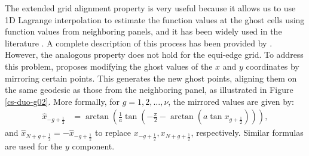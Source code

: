 \documentclass[preprint,12pt]{elsarticle}
\begin{document}
\begin{linenumbers}
%	

The extended grid alignment property is very useful because it allows us to use 1D Lagrange interpolation to estimate the function values at the ghost cells using function values from neighboring panels, and it has been widely used in the literature \cite{ross:2006, croisille:2013,katta:2015,katta:2015b, chen:2021}. 
A complete description of this process has been provided by \cite{zerroukat:2022}. %
However, the analogous property does not hold for the equi-edge grid.
To address this problem, \cite{chen:2021} proposes modifying the ghost values of the $x$ and $y$ coordinates by mirroring certain points. 
This generates the new ghost points, aligning them on the same geodesic as those from the neighboring panel, as illustrated in Figure \ref{cs-duo-g02}.
More formally, for $g=1,2,\ldots,\nu$, the mirrored values are given by:
\begin{align}
	\hat{x}_{-g+\frac{1}{2}}  &= \arctan\left(\frac{1}{a}\tan\left(-\frac{\pi}{2}-\arctan{(a \tan{x_{g+\frac{1}{2}} })}\right)\right),
\end{align}
and	$\hat{x}_{N+g+\frac{1}{2}} = -\hat{x}_{-g+\frac{1}{2}}$
to replace ${x}_{-g+\frac{1}{2}},{x}_{N+g+\frac{1}{2}}$, respectively.
Similar formulas are used for the $y$ component.



\end{linenumbers}
\end{document}
